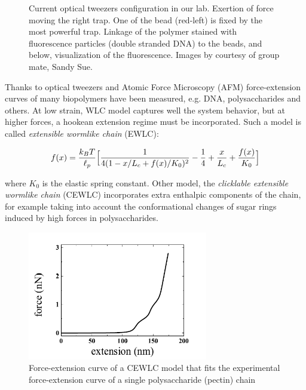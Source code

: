 \begin{figure}[h]
\caption[Optical Tweezers]{ Current
optical tweezers configuration in our lab. 
Exertion of force moving the right trap. One of the bead (red-left) is fixed by
the most powerful trap.  Linkage of the
 polymer stained with fluorescence particles (double stranded DNA) to the beads,
 and below, visualization of the fluorescence. Images by courtesy of group mate,
 Sandy Sue. }
\label{fig:optical_tweezers}
\end{figure}


Thanks to optical tweezers and Atomic Force Microscopy
(AFM)\citep{janshoff_force_2000} force-extension curves of many
biopolymers have been measured, e.g. DNA\citep{marko_stretching_1995},
polysaccharides\citep{marszalek_atomic_1999} and others. At low strain, WLC
model captures well the system behavior, but at higher forces, a hookean extension regime must be
incorporated.
Such a model is called \emph{extensible wormlike chain}
(EWLC)\citep{wang_stretching_1997}:

\begin{equation}\label{EWLC}
f(x)=\frac{k_B{}T}{\ell_p} \Big[ \frac{1}{4(1 - x/L_c + f(x)/K_0)^2}
-\frac{1}{4}+\frac{x}{L_c} + \frac{f(x)}{K_0}\Big]
\end{equation}


where $K_0$ is the elastic spring constant. Other model, the
\emph{clicklable extensible wormlike chain} (CEWLC) incorporates extra
enthalpic components of the chain, for example taking into
account the conformational changes of sugar rings induced by high forces in polysaccharides\citep{haverkamp_model_2007}.


\begin{figure}[h]
\begin{center}
\includegraphics[width=0.7\textwidth,height=0.5\textwidth]{Figures/forceextension_CEWLC.png}%

\caption[Force extension curve: CEWLC]{Force-extension curve of a CEWLC model
that fits the experimental force-extension curve of a single polysaccharide
(pectin) chain\citep{schuster_hierarchical_2011} }
\label{fig:force_extension_CEWLC}
\end{center}
\end{figure}

